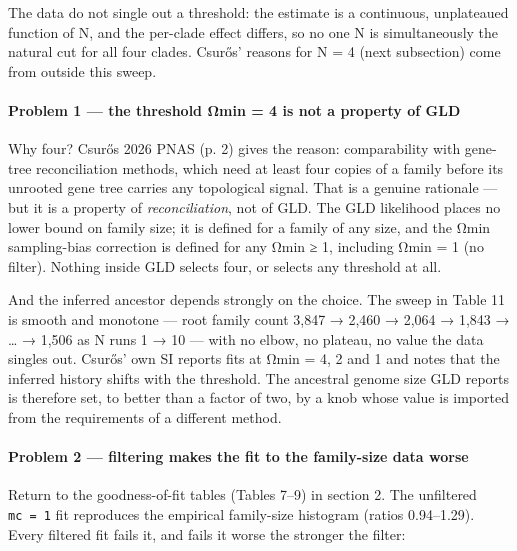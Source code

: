 \documentclass[
  10pt,
]{article}
\begin{document}
The data do not single out a threshold: the estimate is a continuous,
unplateaued function of N, and the per-clade effect differs, so no one N
is simultaneously the natural cut for all four clades. Csurős' reasons
for N = 4 (next subsection) come from outside this sweep.

\paragraph{Problem 1 --- the threshold Ωmin = 4 is not a property of
GLD}\label{problem-1--the-threshold-ux3c9min--4-is-not-a-property-of-gld}

Why four? Csurős 2026 PNAS (p. 2) gives the reason: comparability with
gene-tree reconciliation methods, which need at least four copies of a
family before its unrooted gene tree carries any topological signal.
That is a genuine rationale --- but it is a property of
\emph{reconciliation}, not of GLD. The GLD likelihood places no lower
bound on family size; it is defined for a family of any size, and the
Ωmin sampling-bias correction is defined for any Ωmin ≥ 1, including
Ωmin = 1 (no filter). Nothing inside GLD selects four, or selects any
threshold at all.

And the inferred ancestor depends strongly on the choice. The sweep in
Table 11 is smooth and monotone --- root family count 3,847 → 2,460 →
2,064 → 1,843 → \ldots{} → 1,506 as N runs 1 → 10 --- with no elbow, no
plateau, no value the data singles out. Csurős' own SI reports fits at
Ωmin = 4, 2 and 1 and notes that the inferred history shifts with the
threshold. The ancestral genome size GLD reports is therefore set, to
better than a factor of two, by a knob whose value is imported from the
requirements of a different method.

\paragraph{Problem 2 --- filtering makes the fit to the family-size data
worse}\label{problem-2--filtering-makes-the-fit-to-the-family-size-data-worse}

Return to the goodness-of-fit tables (Tables 7--9) in section 2. The
unfiltered \texttt{mc\ =\ 1} fit reproduces the empirical family-size
histogram (ratios 0.94--1.29). Every filtered fit fails it, and fails it
worse the stronger the filter:
\end{document}
